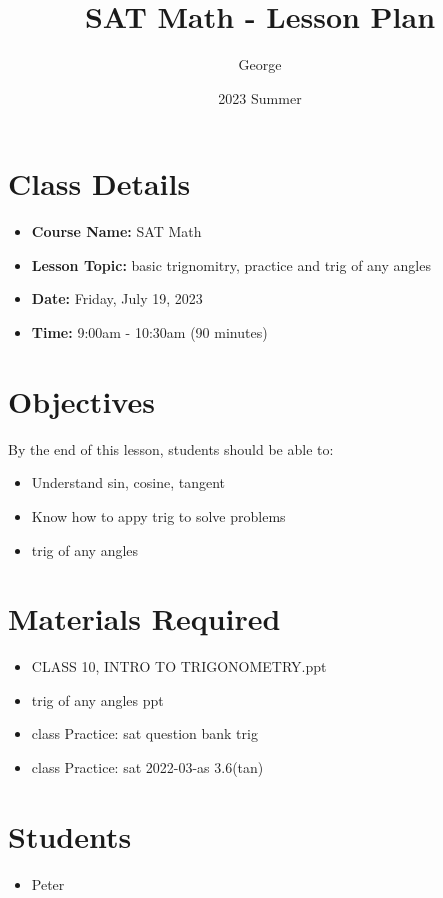 \documentclass[12pt]{article}
\title{SAT Math - Lesson Plan}
\author{George}
\date{2023 Summer}
\begin{document}
\maketitle

\section{Class Details}
\begin{itemize}
    \item \textbf{Course Name:} SAT Math
    \item \textbf{Lesson Topic:}  basic trignomitry, practice and trig of any angles
    \item \textbf{Date:} Friday, July 19, 2023
    \item \textbf{Time:} 9:00am - 10:30am (90 minutes)
\end{itemize}

\section{Objectives}
By the end of this lesson, students should be able to:
\begin{itemize}
    \item Understand sin, cosine, tangent
    \item Know how to appy trig to solve problems
    \item trig of any angles

\end{itemize}

\section{Materials Required}
\begin{itemize}
   
    \item CLASS 10, INTRO TO TRIGONOMETRY.ppt
    \item trig of any angles ppt
    \item class Practice: sat question bank trig
    \item class Practice: sat 2022-03-as 3.6(tan)
  
\end{itemize}


\section{Students}
\begin{itemize}
    \item Peter

\end{itemize}
\end{document}
